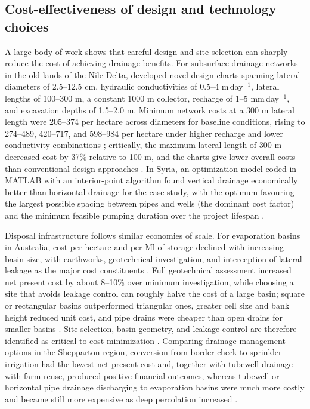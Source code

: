 \documentclass[11pt]{article}
\begin{document}
\subsection{Cost-effectiveness of design and technology choices}
A large body of work shows that careful design and site selection can sharply reduce the cost of achieving drainage benefits. For subsurface drainage networks in the old lands of the Nile Delta, \textcite{Gabr2024} developed novel design charts spanning lateral diameters of 2.5--12.5 cm, hydraulic conductivities of 0.5--4 m\,day$^{-1}$, lateral lengths of 100--300 m, a constant 1000 m collector, recharge of 1--5 mm\,day$^{-1}$, and excavation depths of 1.5--2.0 m. Minimum network costs at a 300 m lateral length were 205--374 per hectare across diameters for baseline conditions, rising to 274--489, 420--717, and 598--984 per hectare under higher recharge and lower conductivity combinations \parencite{Gabr2024}; critically, the maximum lateral length of 300 m decreased cost by 37\% relative to 100 m, and the charts give lower overall costs than conventional design approaches \parencite{Gabr2024}. In Syria, an optimization model coded in MATLAB with an interior-point algorithm found vertical drainage economically better than horizontal drainage for the case study, with the optimum favouring the largest possible spacing between pipes and wells (the dominant cost factor) and the minimum feasible pumping duration over the project lifespan \parencite{Bakour2021}.

Disposal infrastructure follows similar economies of scale. For evaporation basins in Australia, cost per hectare and per Ml of storage declined with increasing basin size, with earthworks, geotechnical investigation, and interception of lateral leakage as the major cost constituents \parencite{Singh2001}. Full geotechnical assessment increased net present cost by about 8--10\% over minimum investigation, while choosing a site that avoids leakage control can roughly halve the cost of a large basin; square or rectangular basins outperformed triangular ones, greater cell size and bank height reduced unit cost, and pipe drains were cheaper than open drains for smaller basins \parencite{Singh2001}. Site selection, basin geometry, and leakage control are therefore identified as critical to cost minimization \parencite{Singh2001}. Comparing drainage-management options in the Shepparton region, conversion from border-check to sprinkler irrigation had the lowest net present cost and, together with tubewell drainage with farm reuse, produced positive financial outcomes, whereas tubewell or horizontal pipe drainage discharging to evaporation basins were much more costly and became still more expensive as deep percolation increased \parencite{Bethune2008}.
\end{document}

